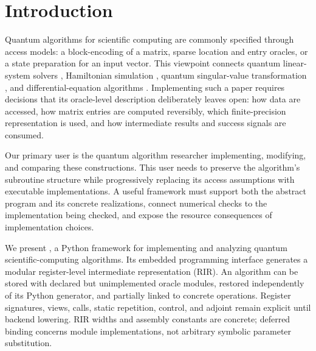 \section{Introduction}
\label{sec:introduction}

Quantum algorithms for scientific computing are commonly specified through
access models: a block-encoding of a matrix, sparse location and entry
oracles, or a state preparation for an input vector.
This viewpoint connects quantum linear-system solvers
\cite{harrow2009hhl,costa2022discrete}, Hamiltonian simulation
\cite{berry2015taylor,childs2021trotter,low2019qubitization},
quantum singular-value transformation \cite{gilyen2019qsvt,martyn2021grand},
and differential-equation algorithms
\cite{an2026lchs,jin2024schrodingerization,liu2021pnas}.
Implementing such a paper requires decisions that its oracle-level
description deliberately leaves open: how data are accessed, how matrix
entries are computed reversibly, which finite-precision representation is
used, and how intermediate results and success signals are consumed.

Our primary user is the quantum algorithm researcher implementing,
modifying, and comparing these constructions. This user needs to preserve
the algorithm's subroutine structure while progressively replacing its
access assumptions with executable implementations. A useful framework
must support both the abstract program and its concrete realizations,
connect numerical checks to the implementation being checked, and expose
the resource consequences of implementation choices.

We present \pqlang{}, a Python framework for implementing and analyzing
quantum scientific-computing algorithms. Its embedded programming interface
generates a modular register-level intermediate representation (RIR).
An algorithm can be stored with declared but unimplemented oracle modules,
restored independently of its Python generator, and partially linked to
concrete operations. Register signatures, views, calls, static repetition,
control, and adjoint remain explicit until backend lowering. RIR widths
and assembly constants are concrete; deferred binding concerns module
implementations, not arbitrary symbolic parameter substitution.

